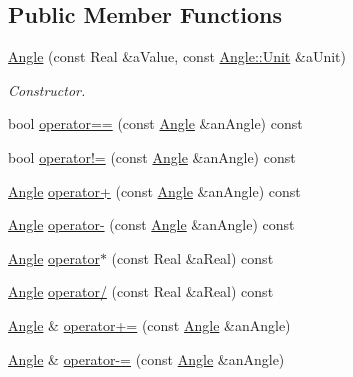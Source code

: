 \subsection*{Public Member Functions}
\begin{DoxyCompactItemize}
\item 
\hyperlink{classlibrary_1_1math_1_1geom_1_1_angle_a216694182e41cf9a4d1363218950f9b0}{Angle} (const Real \&a\+Value, const \hyperlink{classlibrary_1_1math_1_1geom_1_1_angle_ab593c4dafbb9a5c29fdbe114eaae8eae}{Angle\+::\+Unit} \&a\+Unit)
\begin{DoxyCompactList}\small\item\em Constructor. \end{DoxyCompactList}\item 
bool \hyperlink{classlibrary_1_1math_1_1geom_1_1_angle_a6c0aa98d818f36737ccb56b9958a3aca}{operator==} (const \hyperlink{classlibrary_1_1math_1_1geom_1_1_angle}{Angle} \&an\+Angle) const
\item 
bool \hyperlink{classlibrary_1_1math_1_1geom_1_1_angle_a43c33a999884855899e948947643ebc6}{operator!=} (const \hyperlink{classlibrary_1_1math_1_1geom_1_1_angle}{Angle} \&an\+Angle) const
\item 
\hyperlink{classlibrary_1_1math_1_1geom_1_1_angle}{Angle} \hyperlink{classlibrary_1_1math_1_1geom_1_1_angle_a4dff92c2349e609a401121f1940d2c6c}{operator+} (const \hyperlink{classlibrary_1_1math_1_1geom_1_1_angle}{Angle} \&an\+Angle) const
\item 
\hyperlink{classlibrary_1_1math_1_1geom_1_1_angle}{Angle} \hyperlink{classlibrary_1_1math_1_1geom_1_1_angle_a9ea3a5d5b6e5e2dd1561136255ad4bb3}{operator-\/} (const \hyperlink{classlibrary_1_1math_1_1geom_1_1_angle}{Angle} \&an\+Angle) const
\item 
\hyperlink{classlibrary_1_1math_1_1geom_1_1_angle}{Angle} \hyperlink{classlibrary_1_1math_1_1geom_1_1_angle_af2c9c9ccc0e80ac2e569921dac5408d5}{operator$\ast$} (const Real \&a\+Real) const
\item 
\hyperlink{classlibrary_1_1math_1_1geom_1_1_angle}{Angle} \hyperlink{classlibrary_1_1math_1_1geom_1_1_angle_a05e6ef8f52d0da3b32645268024bf8a4}{operator/} (const Real \&a\+Real) const
\item 
\hyperlink{classlibrary_1_1math_1_1geom_1_1_angle}{Angle} \& \hyperlink{classlibrary_1_1math_1_1geom_1_1_angle_a67e2cbe3892df18f186e3f678575b197}{operator+=} (const \hyperlink{classlibrary_1_1math_1_1geom_1_1_angle}{Angle} \&an\+Angle)
\item 
\hyperlink{classlibrary_1_1math_1_1geom_1_1_angle}{Angle} \& \hyperlink{classlibrary_1_1math_1_1geom_1_1_angle_a408b34bcb646956468f7272ebcb64ff9}{operator-\/=} (const \hyperlink{classlibrary_1_1math_1_1geom_1_1_angle}{Angle} \&an\+Angle)

\end{DoxyCompactItemize}
